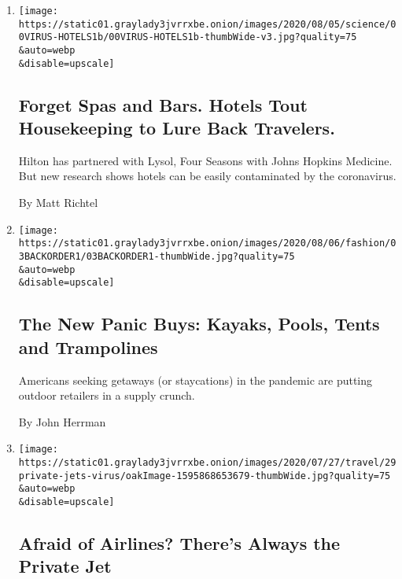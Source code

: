 \begin{enumerate}
\def\labelenumi{\arabic{enumi}.}
\item
  \href{/2020/08/04/health/coronavirus-hotels-infect.html}{}

  \texttt{[image: https://static01.graylady3jvrrxbe.onion/images/2020/08/05/science/00VIRUS-HOTELS1b/00VIRUS-HOTELS1b-thumbWide-v3.jpg?quality=75\\\&auto=webp\\\&disable=upscale]}

  \hypertarget{forget-spas-and-bars-hotels-tout-housekeeping-to-lure-back-travelers}{%
  \subsection{Forget Spas and Bars. Hotels Tout Housekeeping to Lure
  Back
  Travelers.}\label{forget-spas-and-bars-hotels-tout-housekeeping-to-lure-back-travelers}}

  Hilton has partnered with Lysol, Four Seasons with Johns Hopkins
  Medicine. But new research shows hotels can be easily contaminated by
  the coronavirus.

  By Matt Richtel
\item
  \href{/2020/08/04/style/outdoor-camping-gear-pools-backordered.html}{}

  \texttt{[image: https://static01.graylady3jvrrxbe.onion/images/2020/08/06/fashion/03BACKORDER1/03BACKORDER1-thumbWide.jpg?quality=75\\\&auto=webp\\\&disable=upscale]}

  \hypertarget{the-new-panic-buys-kayaks-pools-tents-and-trampolines}{%
  \subsection{The New Panic Buys: Kayaks, Pools, Tents and
  Trampolines}\label{the-new-panic-buys-kayaks-pools-tents-and-trampolines}}

  Americans seeking getaways (or staycations) in the pandemic are
  putting outdoor retailers in a supply crunch.

  By John Herrman
\item
  \href{/2020/07/30/travel/private-jets-coronavirus.html}{}

  \texttt{[image: https://static01.graylady3jvrrxbe.onion/images/2020/07/27/travel/29private-jets-virus/oakImage-1595868653679-thumbWide.jpg?quality=75\\\&auto=webp\\\&disable=upscale]}

  \hypertarget{afraid-of-airlines-theres-always-the-private-jet}{%
  \subsection{Afraid of Airlines? There's Always the Private
  Jet}\label{afraid-of-airlines-theres-always-the-private-jet}}


\end{enumerate}
